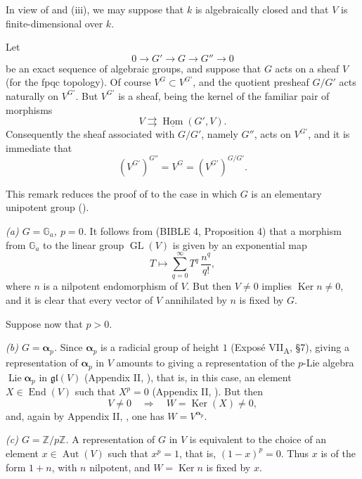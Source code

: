 
In view of  and (iii), we may suppose that \(k\) is
algebraically closed and that \(V\) is finite-dimensional over \(k\).

Let
\[
  0\longrightarrow G'\longrightarrow G\longrightarrow G''
    \longrightarrow0
\]
be an exact sequence of algebraic groups, and suppose that \(G\) acts
on a sheaf \(V\) (for the fpqc topology).  Of course
\(V^G\subset V^{G'}\), and the quotient presheaf \(G/G'\) acts
naturally on \(V^{G'}\).  But \(V^{G'}\) is a sheaf, being the kernel
of the familiar pair of morphisms
\[
  V\rightrightarrows\underline{\operatorname{Hom}}(G',V).
\]
Consequently the sheaf associated with \(G/G'\), namely \(G''\),
acts on \(V^{G'}\), and it is immediate that
\[
  \left(V^{G'}\right)^{G''}
  =V^G
  =\left(V^{G'}\right)^{G/G'}.
\]

This remark reduces the proof of  to the case in which \(G\) is an
elementary unipotent group ().

\textit{(a) \(G=\mathbb G_a\), \(p=0\).}
It follows from (BIBLE 4, Proposition 4) that a morphism from
\(\mathbb G_a\) to the linear group \(\operatorname{GL}(V)\) is given
by an exponential map
\[
  T\longmapsto\sum_{q=0}^{\infty}T^q\,\frac{n^q}{q!},
\]
where \(n\) is a nilpotent endomorphism of \(V\).  But then
\(V\ne0\) implies \(\operatorname{Ker}n\ne0\), and it is clear that
every vector of \(V\) annihilated by \(n\) is fixed by \(G\).

Suppose now that \(p>0\).

\textit{(b) \(G=\boldsymbol\alpha_p\).}
Since \(\boldsymbol\alpha_p\) is a radicial group of height \(1\)
(Exposé VII\textsubscript{A}, \S7), giving a representation of
\(\boldsymbol\alpha_p\) in \(V\) amounts to giving a representation
of the \(p\)-Lie algebra \(\operatorname{Lie}\boldsymbol\alpha_p\) in
\(\mathfrak{gl}(V)\) (Appendix II, ), that is, in this case, an
element \(X\in\operatorname{End}(V)\) such that \(X^p=0\)
(Appendix II, ).  But then
\[
  V\ne0\quad\Longrightarrow\quad
  W=\operatorname{Ker}(X)\ne0,
\]
and, again by Appendix II, , one has
\(W=V^{\boldsymbol\alpha_p}\).

\textit{(c) \(G=\mathbb Z/p\mathbb Z\).}
A representation of \(G\) in \(V\) is equivalent to the choice of an
element \(x\in\operatorname{Aut}(V)\) such that \(x^p=1\), that is,
\((1-x)^p=0\).  Thus \(x\) is of the form \(1+n\), with \(n\)
nilpotent, and \(W=\operatorname{Ker}n\) is fixed by \(x\).

